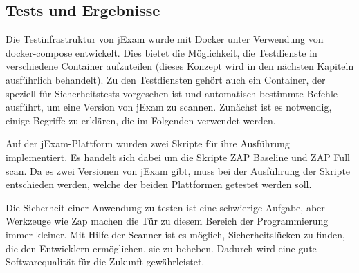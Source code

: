 \subsection{Tests und Ergebnisse}

Die Testinfrastruktur von jExam wurde mit Docker unter Verwendung
von docker-compose entwickelt. Dies bietet die Möglichkeit, die
Testdienste in verschiedene Container aufzuteilen (dieses Konzept
wird in den nächsten Kapiteln ausführlich behandelt). Zu den
Testdiensten gehört auch ein Container, der speziell für Sicherheitstests
vorgesehen ist und automatisch bestimmte Befehle ausführt, um eine Version
von jExam zu scannen. Zunächst ist es notwendig, einige Begriffe zu
erklären, die im Folgenden verwendet werden.







Auf der jExam-Plattform wurden zwei Skripte für ihre Ausführung
implementiert. Es handelt sich dabei um die Skripte ZAP Baseline und
ZAP Full scan.  Da es zwei Versionen von jExam gibt, muss bei der
Ausführung der Skripte entschieden werden, welche der beiden Plattformen
getestet werden soll.






Die Sicherheit einer Anwendung zu testen ist eine schwierige Aufgabe,
aber Werkzeuge wie Zap machen die Tür zu diesem Bereich der Programmierung
immer kleiner. Mit Hilfe der Scanner ist es möglich, Sicherheitslücken zu
finden, die den Entwicklern ermöglichen, sie zu beheben. Dadurch wird eine
gute Softwarequalität für die Zukunft gewährleistet.







